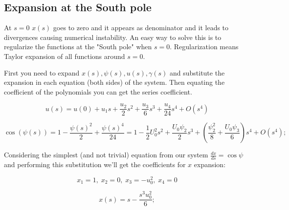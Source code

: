 \documentclass[12pt]{article}
\begin{document}
\subsection{Expansion at the South pole}

At $s=0$ $x(s)$ goes to zero and it appears as denominator and it leads to divergences causing numerical instability. An easy way to solve this is to regularize the functions at the "South pole" when $s=0$. Regularization means Taylor expansion of all functions around $s=0$.


First you need to expand $x(s),\psi(s),u(s),\gamma(s)$ and substitute the expansion in each equation (both sides) of the system. Then equating the coefficient of the polynomials you can get the series coefficient.

$$
u(s)=u(0) + u_1s + \frac{u_2 }{2}s^2 + \frac{u_3 }{6}s^3 + \frac{u_4 }{24}s^4 + O(s^4)
$$


$$
\cos(\psi(s))= 1 - \frac{\psi(s)^2}{2} + \frac{\psi(s)^4}{24} = 1 - \frac{1}{2} U_0^2 s^2 + \frac{U_0 \psi_2}{2} s^3 + (\frac{\psi_2^2}{8} + \frac{U_0 \psi_3}{6}) s^4 +O(s^4);
$$













Considering the simplest (and not trivial) equation from our system $\frac{dx}{ds} =  \cos \psi$ and performing this substitution we'll get the coefficients for $x$ expansion:

$$
x_1 = 1 ,\; x_2 = 0 ,\; x_3 = - u_0^2 ,\; x_4 = 0
$$

$$
x(s)=s-\frac{s^3 u_0^2}{6};
$$
\end{document}
